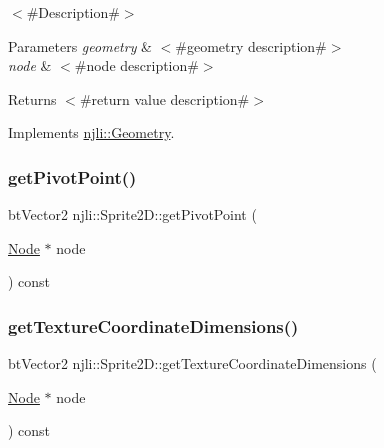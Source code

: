 $<$\#\+Description\#$>$


\begin{DoxyParams}{Parameters}
{\em geometry} & $<$\#geometry description\#$>$ \\
\hline
{\em node} & $<$\#node description\#$>$\\
\hline
\end{DoxyParams}
\begin{DoxyReturn}{Returns}
$<$\#return value description\#$>$ 
\end{DoxyReturn}


Implements \mbox{\hyperlink{classnjli_1_1_geometry_a125699411e1abc464f923fe4e72fc65b}{njli\+::\+Geometry}}.

\mbox{\label{classnjli_1_1_sprite2_d_aa9356cd4e3fbbaab5a28131ebc04844e}} 
\subsubsection{\texorpdfstring{get\+Pivot\+Point()}{getPivotPoint()}}
{\footnotesize\ttfamily bt\+Vector2 njli\+::\+Sprite2\+D\+::get\+Pivot\+Point (\begin{DoxyParamCaption}\item[{\mbox{\hyperlink{classnjli_1_1_node}{Node}} $\ast$}]{node }\end{DoxyParamCaption}) const}

\mbox{\label{classnjli_1_1_sprite2_d_ab58d425fdb3e71e2d76dc472690f5ba3}} 
\subsubsection{\texorpdfstring{get\+Texture\+Coordinate\+Dimensions()}{getTextureCoordinateDimensions()}}
{\footnotesize\ttfamily bt\+Vector2 njli\+::\+Sprite2\+D\+::get\+Texture\+Coordinate\+Dimensions (\begin{DoxyParamCaption}\item[{\mbox{\hyperlink{classnjli_1_1_node}{Node}} $\ast$}]{node }\end{DoxyParamCaption}) const}

